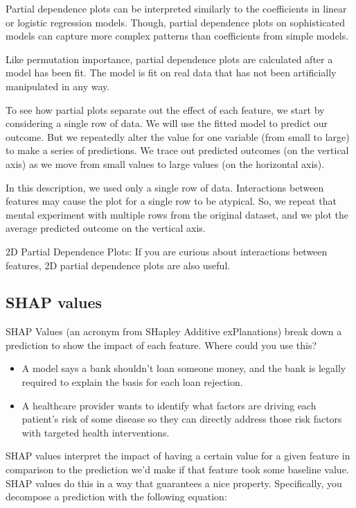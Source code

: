 \documentclass[12pt]{report}
\begin{document}
Partial dependence plots can be interpreted similarly to the coefficients in linear or logistic regression models. Though, partial dependence plots on sophisticated models can capture more complex patterns than coefficients from simple models.

Like permutation importance, partial dependence plots are calculated after a model has been fit. The model is fit on real data that has not been artificially manipulated in any way.

To see how partial plots separate out the effect of each feature, we start by considering a single row of data. We will use the fitted model to predict our outcome. But we repeatedly alter the value for one variable (from small to large) to make a series of predictions. We trace out predicted outcomes (on the vertical axis) as we move from small values to large values (on the horizontal axis).

In this description, we used only a single row of data. Interactions between features may cause the plot for a single row to be atypical. So, we repeat that mental experiment with multiple rows from the original dataset, and we plot the average predicted outcome on the vertical axis.


2D Partial Dependence Plots: If you are curious about interactions between features, 2D partial dependence plots are also useful.


\subsection{SHAP values}

SHAP Values (an acronym from SHapley Additive exPlanations) break down a prediction to show the impact of each feature. Where could you use this?
\begin{itemize}
\item A model says a bank shouldn't loan someone money, and the bank is legally required to explain the basis for each loan rejection.
\item A healthcare provider wants to identify what factors are driving each patient's risk of some disease so they can directly address those risk factors with targeted health interventions.
\end{itemize}

SHAP values interpret the impact of having a certain value for a given feature in comparison to the prediction we'd make if that feature took some baseline value. SHAP values do this in a way that guarantees a nice property. Specifically, you decompose a prediction with the following equation:
\end{document}
